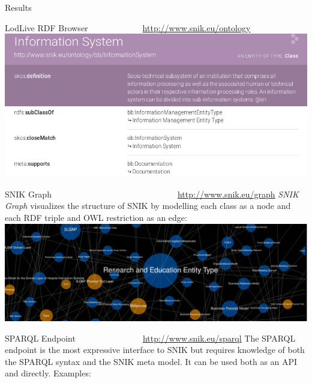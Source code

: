 \documentclass[portrait,final,a0paper,fontscale=0.320]{imiseposter}
\begin{document}
\begin{poster}
\begin{posterbox}[name=results,column=1]{Results}
\begin{subsectionbox}{LodLive RDF Browser~~~~~~~~~~~~~\url{http://www.snik.eu/ontology}}
\includegraphics[width=\textwidth]{img/lodlive.png}
\vspace{-1.0em}
\end{subsectionbox}
\vspace{-0.5em}

\begin{subsectionbox}{SNIK Graph~~~~~~~~~~~~~~~~~~~~~~~~~~~~~~\url{http://www.snik.eu/graph}}
\emph{SNIK Graph} visualizes the structure of SNIK by modelling each class as a node and each RDF triple and OWL restriction as an edge:
\includegraphics[width=\textwidth]{img/snikgraph.png}
\vspace{-1.0em}
\end{subsectionbox}
\vspace{-0.5em}

\begin{subsectionbox}{SPARQL Endpoint~~~~~~~~~~~~~~~~\url{http://www.snik.eu/sparql}}
The SPARQL endpoint is the most expressive interface to SNIK but requires knowledge of both the SPARQL syntax and the SNIK meta model.
It can be used both as an API and directly. Examples:\\


\end{subsectionbox}
\end{posterbox}
\end{poster}
\end{document}
